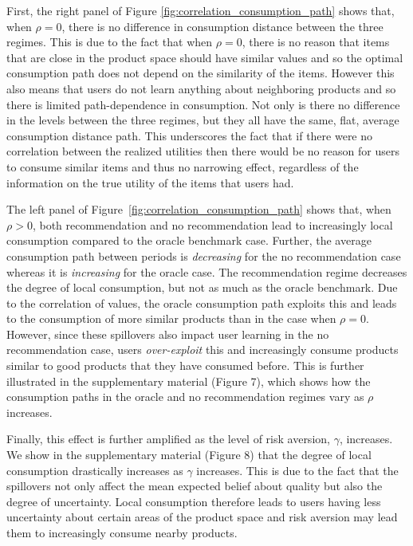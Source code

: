 \documentclass[format=acmsmall, review=false]{acmart}
\begin{document}
First, the right panel of Figure \ref{fig:correlation_consumption_path} shows that, when $\rho = 0$, there is no difference in consumption distance between the three regimes. This is due to the fact that when $\rho = 0$, there is no reason that items that are close in the product space should have similar values and so the optimal consumption path does not depend on the similarity of the items. However this also means that users do not learn anything about neighboring products and so there is limited path-dependence in consumption. Not only is there no difference in the levels between the three regimes, but they all have the same, flat, average consumption distance path. This underscores the fact that if there were no correlation between the realized utilities then there would be no reason for users to consume similar items and thus no narrowing effect, regardless of the information on the true utility of the items that users had.
\par
The left panel of Figure~\ref{fig:correlation_consumption_path} shows that, when $\rho > 0$, both recommendation and no recommendation lead to increasingly local consumption compared to the oracle benchmark case. Further, the average consumption path between periods is \textit{decreasing} for the no recommendation case whereas it is \textit{increasing} for the oracle case. The recommendation regime decreases the degree of local consumption, but not as much as the oracle benchmark. Due to the correlation of values, the oracle consumption path exploits this and leads to the consumption of more similar products than in the case when $\rho = 0$. However, since these spillovers also impact user learning in the no recommendation case, users \textit{over-exploit} this and increasingly consume products similar to good products that they have consumed before. This is further illustrated in the supplementary material (Figure 7), which shows how the consumption paths in the oracle and no recommendation regimes vary as $\rho$ increases.
\par

Finally, this effect is further amplified as the level of risk aversion, $\gamma$, increases. We show in the supplementary material (Figure 8) that the degree of local consumption drastically increases as $\gamma$ increases. This is due to the fact that the spillovers not only affect the mean expected belief about quality but also the degree of uncertainty. Local consumption therefore leads to users having less uncertainty about certain areas of the product space and risk aversion may lead them to increasingly consume nearby products.
\end{document}
